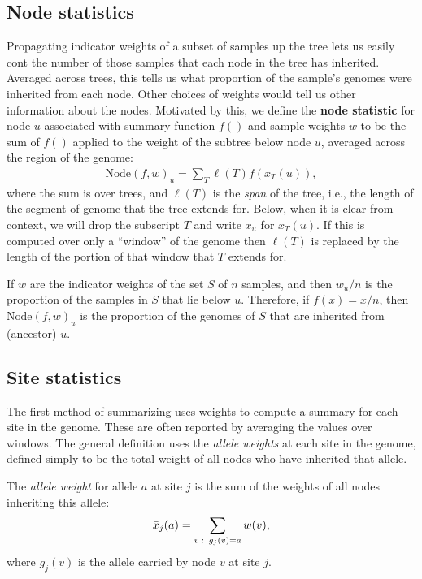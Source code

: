 \documentclass{article}
\newcommand{\node}{\mbox{Node}} %
\newcommand{\iw}{w} %
\newcommand{\nw}{x} %
\newcommand{\aw}{{\bar x}} %
\newcommand{\treespan}{\ell}
\begin{document}
\subsection*{Node statistics}

Propagating indicator weights of a subset of samples up the tree
lets us easily cont the number of those samples that each node in the tree has inherited.
Averaged across trees,
this tells us what proportion of the sample's genomes were inherited from each node.
Other choices of weights would tell us other information about the nodes.
Motivated by this, we define the
\textbf{node statistic} for node $u$
associated with summary function $f()$ and sample weights $\iw$
to be the sum of $f()$ applied to the weight of the subtree below node $u$,
averaged across the region of the genome:
\begin{align}
    \node(f, \iw)_u
    =
    \sum_T \treespan(T) f(\nw_T(u)) ,
\end{align}
where the sum is over trees, and $\treespan(T)$ is the \emph{span} of the tree,
i.e., the length of the segment of genome that the tree extends for.
Below, when it is clear from context,
we will drop the subscript $T$ and write $\nw_u$ for $\nw_T(u)$.
If this is computed over only a ``window'' of the genome
then $\treespan(T)$ is replaced by the length of the portion of that window
that $T$ extends for.

\begin{example}
    If $\iw$ are the indicator weights of the set $S$ of $n$ samples,
    and then $\iw_u / n$ is the proportion of the samples in $S$ that lie below $u$.
    Therefore, if $f(x) = x / n$,
    then $\node(f, \iw)_u$ is the proportion of the genomes of $S$
    that are inherited from (ancestor) $u$.
\end{example}


\subsection*{Site statistics}

The first method of summarizing uses weights
to compute a summary for each site in the genome.
These are often reported by averaging the values over windows.
The general definition uses the \emph{allele weights} at each site in the genome,
defined simply to be the total weight of all nodes who have inherited that allele.

\begin{definition}
    The \emph{allele weight} for allele $a$ at site $j$ is the sum of the weights
    of all nodes inheriting this allele:
    \begin{align*}
        \aw_j(a) = \sum_{v \st g_j(v) = a} \iw(v) ,
    \end{align*}
    where $g_j(v)$ is the allele carried by node $v$ at site $j$.
\end{definition}
\end{document}
